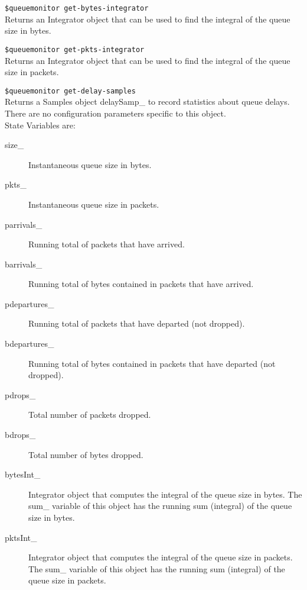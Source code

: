 {\tt \$queuemonitor get-bytes-integrator}\\
Returns an Integrator object that can be used to find the integral of the
queue size in bytes. 

{\tt \$queuemonitor get-pkts-integrator}\\
Returns an Integrator object that can be used to find the integral of the
queue size in packets.

{\tt \$queuemonitor get-delay-samples}\\
Returns a Samples object delaySamp\_ to record statistics about queue
delays.
\\
There are no configuration parameters specific to this object. 
\\
State Variables are:
\begin{description}
\item[size\_] Instantaneous queue size in bytes. 

\item[pkts\_] Instantaneous queue size in packets. 

\item[parrivals\_] Running total of packets that have arrived. 

\item[barrivals\_] Running total of bytes contained in packets that have
arrived. 

\item[pdepartures\_] Running total of packets that have departed (not
dropped). 

\item[bdepartures\_] Running total of bytes contained in packets that have
departed (not dropped). 

\item[pdrops\_] Total number of packets dropped. 

\item[bdrops\_] Total number of bytes dropped. 

\item[bytesInt\_] Integrator object that computes the integral of the
queue size in bytes. The sum\_ variable of this object has the running sum
(integral) of the queue size in bytes. 

\item[pktsInt\_] Integrator object that computes the integral of the queue
size in packets. The sum\_ variable of this object has the running sum
(integral) of the queue size in packets. 
\end{description}


